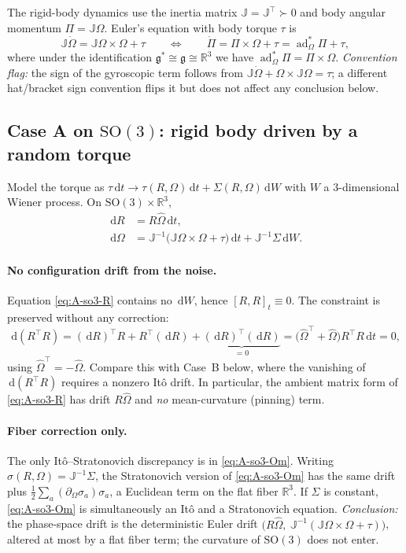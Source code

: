 \documentclass[11pt]{article}
\theoremstyle{plain}
\theoremstyle{definition}
\newcommand{\g}{\mathfrak{g}}
\newcommand{\gstar}{\mathfrak{g}^{*}}
\newcommand{\SO}{\mathrm{SO}(3)}
\newcommand{\adstar}{\operatorname{ad}^{*}}
\newcommand{\cd}{\,\mathrm{d}}          %
\newcommand{\dW}{\,\mathrm{d}W}
\newcommand{\dt}{\,\mathrm{d}t}
\newcommand{\R}{\mathbb{R}}
\newcommand{\J}{\mathbb{J}}
\newcommand{\Om}{\Omega}
\newcommand{\Pib}{\Pi}
\newcommand{\half}{\tfrac{1}{2}}
\begin{document}
The rigid-body dynamics use the inertia matrix $\J=\J^\top\succ0$ and body
angular momentum $\Pib=\J\Om$. Euler's equation with body torque $\tau$ is
\begin{equation}
  \J\dot\Om = \J\Om\times\Om + \tau
  \qquad\Longleftrightarrow\qquad
  \dot\Pib=\Pib\times\Om+\tau=\adstar_\Om\Pib+\tau,
  \label{eq:euler}
\end{equation}
where under the identification $\gstar\cong\g\cong\R^3$ we have
$\adstar_\Om\Pib=\Pib\times\Om$. \emph{Convention flag:} the sign of the gyroscopic
term follows from $\J\dot\Om+\Om\times\J\Om=\tau$; a different hat/bracket sign
convention flips it but does not affect any conclusion below.

\subsection{Case A on $\SO$: rigid body driven by a random torque}

Model the torque as $\tau\dt\to \tau(R,\Om)\dt+\Sigma(R,\Om)\dW$ with $W$ a
$3$-dimensional Wiener process. On $\SO\times\R^3$,
\begin{align}
  \cd R   &= R\hat\Om\dt, \label{eq:A-so3-R}\\
  \cd \Om &= \J^{-1}\!\big(\J\Om\times\Om+\tau\big)\dt + \J^{-1}\Sigma\dW. \label{eq:A-so3-Om}
\end{align}

\paragraph{No configuration drift from the noise.}
Equation \eqref{eq:A-so3-R} contains no $\dW$, hence $[R,R]_t\equiv0$. The
constraint is preserved without any correction:
\begin{equation}
  \cd(R^\top R)=(\cd R)^\top R+R^\top(\cd R)+\underbrace{(\cd R)^\top(\cd R)}_{=0}
  =\big(\hat\Om^\top+\hat\Om\big)R^\top R\dt = 0,
\end{equation}
using $\hat\Om^\top=-\hat\Om$. Compare this with Case~B below, where the vanishing
of $\cd(R^\top R)$ requires a nonzero It\^o drift. In particular, the ambient
matrix form of \eqref{eq:A-so3-R} has drift $R\hat\Om$ and \emph{no}
mean-curvature (pinning) term.

\paragraph{Fiber correction only.}
The only It\^o--Stratonovich discrepancy is in \eqref{eq:A-so3-Om}. Writing
$\sigma(R,\Om)=\J^{-1}\Sigma$, the Stratonovich version of \eqref{eq:A-so3-Om} has
the same drift plus $\half\sum_a(\partial_\Om\sigma_a)\sigma_a$, a Euclidean term
on the flat fiber $\R^3$. If $\Sigma$ is constant, \eqref{eq:A-so3-Om} is
simultaneously an It\^o and a Stratonovich equation. \emph{Conclusion:} the
phase-space drift is the deterministic Euler drift
$\big(R\hat\Om,\ \J^{-1}(\J\Om\times\Om+\tau)\big)$, altered at most by a flat
fiber term; the curvature of $\SO$ does not enter.
\end{document}
